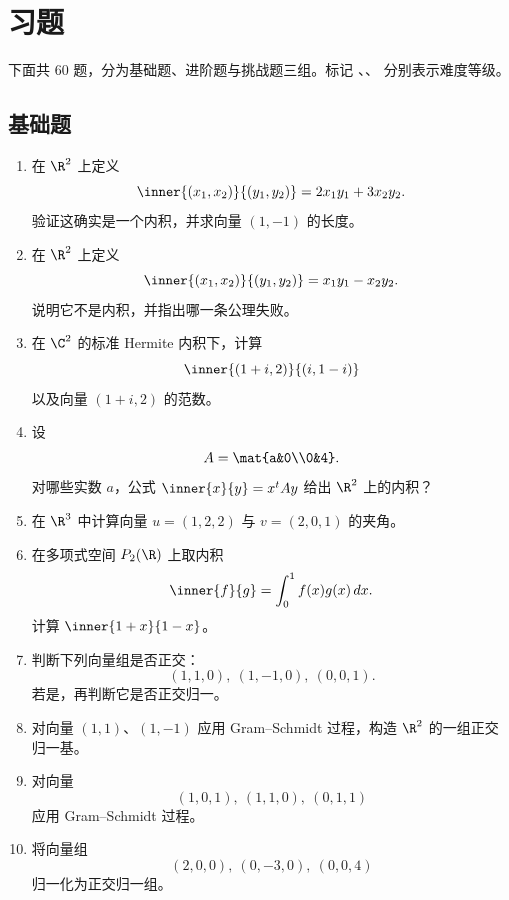 \section*{习题}

下面共 $60$ 题，分为基础题、进阶题与挑战题三组。标记 \basic、\medium、\hard{} 分别表示难度等级。

\subsection*{基础题}

\begin{enumerate}[label=\textbf{5.\arabic*.}]
  \item \basic 在 $\R^2$ 上定义
  \[
  \inner{(x_1,x_2)}{(y_1,y_2)}=2x_1y_1+3x_2y_2.
  \]
  验证这确实是一个内积，并求向量 $(1,-1)$ 的长度。

  \item \basic 在 $\R^2$ 上定义
  \[
  \inner{(x_1,x_2)}{(y_1,y_2)}=x_1y_1-x_2y_2.
  \]
  说明它不是内积，并指出哪一条公理失败。

  \item \basic 在 $\C^2$ 的标准 Hermite 内积下，计算
  \[
  \inner{(1+i,2)}{(i,1-i)}
  \]
  以及向量 $(1+i,2)$ 的范数。

  \item \basic 设
  \[
  A=\mat{a&0\\0&4}.
  \]
  对哪些实数 $a$，公式 $\inner{x}{y}=x^tAy$ 给出 $\R^2$ 上的内积？

  \item \basic 在 $\R^3$ 中计算向量 $u=(1,2,2)$ 与 $v=(2,0,1)$ 的夹角。

  \item \basic 在多项式空间 $P_2(\R)$ 上取内积
  \[
  \inner{f}{g}=\int_0^1 f(x)g(x)\,dx.
  \]
  计算 $\inner{1+x}{1-x}$。

  \item \basic 判断下列向量组是否正交：
  \[
  (1,1,0),\ (1,-1,0),\ (0,0,1).
  \]
  若是，再判断它是否正交归一。

  \item \basic 对向量 $(1,1)$、$(1,-1)$ 应用 Gram--Schmidt 过程，构造 $\R^2$ 的一组正交归一基。

  \item \basic 对向量
  \[
  (1,0,1),\ (1,1,0),\ (0,1,1)
  \]
  应用 Gram--Schmidt 过程。

  \item \basic 将向量组
  \[
  (2,0,0),\ (0,-3,0),\ (0,0,4)
  \]
  归一化为正交归一组。


\end{enumerate}
